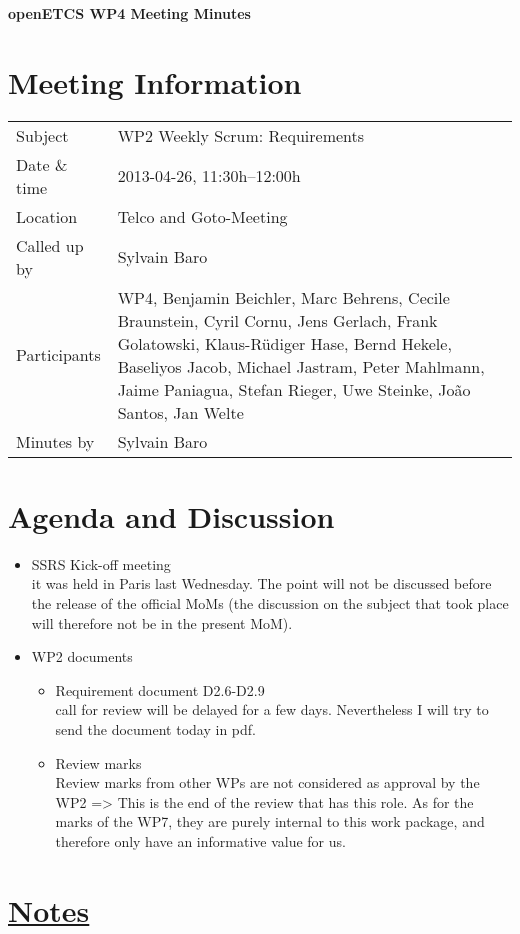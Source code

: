 \documentclass[a4paper, 11pt]{article}
\begin{document}
{\begin{center}\huge\bf openETCS WP4 Meeting Minutes\end{center}}
\section{Meeting Information}

\renewcommand{\arraystretch}{1.5}
\begin{supertabular}{m{.2\textwidth}m{.8\textwidth}}
Subject & WP2 Weekly Scrum: Requirements\\
Date \& time & 2013-04-26, 11:30h--12:00h\\
Location & Telco and Goto-Meeting\\
Called up by & Sylvain Baro\\
Participants & WP4,
Benjamin Beichler,
Marc Behrens,
Cecile Braunstein,
Cyril Cornu, 
Jens Gerlach, 
Frank Golatowski, 
Klaus-R\"udiger Hase,
Bernd Hekele,
Baseliyos Jacob,
Michael Jastram, 
Peter Mahlmann, 
Jaime Paniagua,
Stefan Rieger,
Uwe Steinke,
Jo\~ao Santos,
Jan Welte\\

Minutes by & Sylvain Baro\\

\end{supertabular}
\renewcommand{\arraystretch}{1.0}


\section{{Agenda and Discussion}}

\begin{itemize}
\item   SSRS Kick-off meeting\\
it was held in Paris last Wednesday. The point will not be discussed before the release of the official MoMs (the discussion on the subject that took place will therefore not be in the present MoM).
\item WP2 documents\\
\begin{itemize}
\item Requirement document D2.6-D2.9\\
call for review will be delayed for a few days. Nevertheless I will try to send the document today in pdf.
\item Review marks\\
Review marks from other WPs are not considered as approval by the WP2 => This is the end of the review that has this role. As for the marks of the WP7, they are purely internal to this work package, and therefore only have an informative value for us.
\end{itemize}
\end{itemize}

\section{\underline{Notes}}
\end{document}

